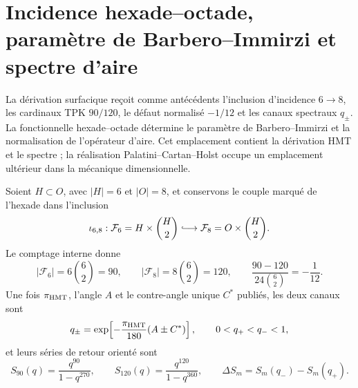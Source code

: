 \section{Incidence hexade--octade, paramètre de Barbero--Immirzi et spectre d'aire}
\label{sec:l9s102:barbero-area}

La dérivation surfacique reçoit comme antécédents l'inclusion d'incidence
\(6\to8\), les cardinaux TPK \(90/120\), le défaut normalisé
\(-1/12\) et les canaux spectraux \(q_\pm\). La fonctionnelle
hexade--octade détermine le paramètre de Barbero--Immirzi et la
normalisation de l'opérateur d'aire. Cet emplacement contient la dérivation
HMT et le spectre ; la réalisation Palatini--Cartan--Holst occupe un emplacement
ultérieur dans la mécanique dimensionnelle.

Soient \(H\subset O\), avec \(|H|=6\) et \(|O|=8\), et conservons le couple
marqué de l'hexade dans l'inclusion
\begin{equation}
 \iota_{6,8}:\mathcal F_6=H\times\binom H2
 \lhook\joinrel\longrightarrow
 \mathcal F_8=O\times\binom H2.
 \label{eq:l9s102:barbero-inclusion-incidencia}
\end{equation}
Le comptage interne donne
\begin{equation}
 |\mathcal F_6|=6\binom62=90,
 \qquad |\mathcal F_8|=8\binom62=120,
 \qquad
 \frac{90-120}{24\binom62}=-\frac1{12}.
 \label{eq:l9s102:barbero-conteos}
\end{equation}
Une fois \(\pi_{\rm HMT}\), l'angle \(A\) et le
contre-angle unique \(C^*\) publiés, les deux canaux sont
\begin{equation}
 q_\pm=\exp\!\left[-\frac{\pi_{\rm HMT}}{180}(A\pm C^*)\right],
 \qquad 0<q_+<q_-<1,
 \label{eq:l9s102:barbero-qpm}
\end{equation}
et leurs séries de retour orienté sont
\begin{equation}
 S_{90}(q)=\frac{q^{90}}{1-q^{270}},\qquad
 S_{120}(q)=\frac{q^{120}}{1-q^{360}},\qquad
 \Delta S_m=S_m(q_-)-S_m(q_+).
 \label{eq:l9s102:barbero-series}
\end{equation}

